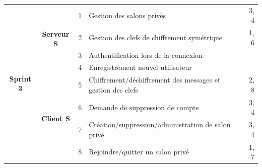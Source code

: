 \documentclass[a4paper,11pt,french]{article}
\begin{document}
\begin{tabular}{|c|c|r|l|r|}
\multirow{8}{*}{\begin{sideways}\textbf{Sprint 3}\end{sideways}}&\multirow{4}{*}{\begin{sideways}\textbf{Serveur S}\end{sideways}}&1& Gestion des salons privés & 3, 4\\
&&2& Gestion des clefs de chiffrement symétrique & 1, 6\\
&&3& Authentification lors de la connexion & \\
&&4& Enregistrement nouvel utilisateur & \\
\cline{2-5}
&\multirow{4}{*}{\begin{sideways}\textbf{Client S}\end{sideways}}& 5 & Chiffrement/déchiffrement des messages et gestion des clefs & 2, 8\\
&& 6 & Demande de suppression de compte & 3, 4\\
&& 7 & Création/suppression/administration de salon privé & 3, 4\\
&& 8 & Rejoindre/quitter un salon privé & 1, 7\\
\hline

\end{tabular}
\end{document}
